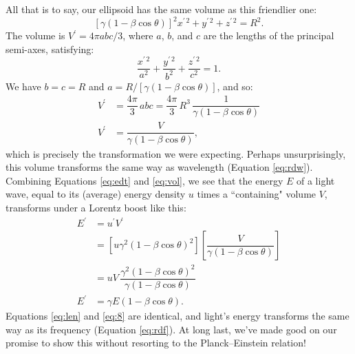 \documentclass[12pt]{article}
\begin{document}
All that is to say, our ellipsoid has the same volume as this friendlier one:
\begin{equation*}
\left[ \gamma ( 1 - \beta \cos{\theta} ) \right]^2 x^{\prime \, 2} + y^{\prime \, 2} + z^{\prime \, 2} = R^2 .
\end{equation*}
The volume is $V^\prime = 4 \pi abc / 3$, where $a$, $b$, and $c$ are the lengths of the principal semi-axes, satisfying:
\begin{equation*}
\dfrac{x^{\prime \, 2}}{a^2} + \dfrac{y^{\prime \, 2}}{b^2} + \dfrac{z^{\prime \, 2}}{c^2} = 1 .
\end{equation*}
We have $b = c = R$ and $a = R / [\gamma ( 1 - \beta \cos{\theta} )]$, and so:
\begin{equation}\label{eq:vol}
\begin{split}
V^\prime &= \dfrac{4 \pi}{3} \, abc = \dfrac{4 \pi }{3} \, R^3 \, \dfrac{1}{\gamma \left( 1 - \beta \cos{\theta} \right)} \\
V^\prime &= \dfrac{V}{\gamma \left( 1 - \beta \cos{\theta} \right)} ,
\end{split}
\end{equation}
which is precisely the transformation we were expecting. Perhaps unsurprisingly, this volume transforms the same way as wavelength (Equation \ref{eq:rdw}). Combining Equations \ref{eq:edt} and \ref{eq:vol}, we see that the energy $E$ of a light wave, equal to its (average) energy density $u$ times a ``containing" volume $V$, transforms under a Lorentz boost like this:
\begin{equation}\label{eq:len}
\begin{split}
E^\prime &= u^\prime V^\prime \\
&= \left[ u \gamma^2 ( 1 - \beta \cos{\theta} )^2  \right] \left[ \dfrac{V}{\gamma ( 1 - \beta \cos{\theta} )} \right] \\[4pt]
&= uV \, \dfrac{\gamma^2 ( 1 - \beta \cos{\theta} )^2}{\gamma ( 1 - \beta \cos{\theta} )} \\[5pt]
E^\prime &= \gamma E \left( 1 - \beta \cos{\theta} \right) .
\end{split}
\end{equation}
Equations \ref{eq:len} and \ref{eq:8} are identical, and light's energy transforms the same way as its frequency (Equation \ref{eq:rdf}). At long last, we've made good on our promise to show this without resorting to the Planck--Einstein relation!
\end{document}
